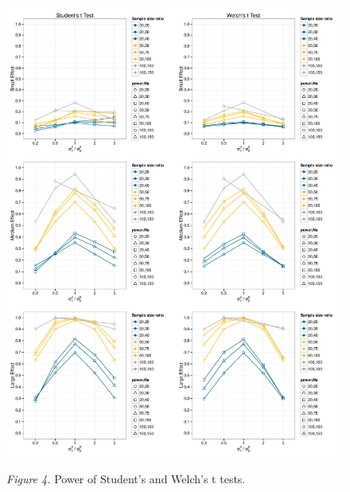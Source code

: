 \documentclass[man,a4paper,noextraspace,apacite]{apa6}
\begin{document}
\begin{figure}
\includegraphics{WelchManuscript-MASTER-plotPower}

\textit{Figure 4.} Power of Student's and Welch's t tests.
\end{figure}
\end{document}
